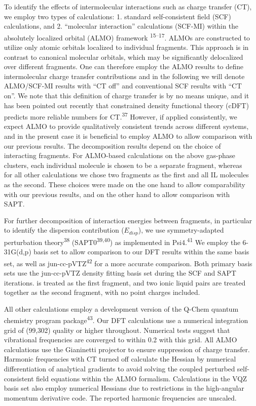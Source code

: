 To identify the effects of intermolecular interactions such as charge transfer (CT), we employ two types of calculations: 1. standard self-consistent field (SCF) calculations, and 2. ``molecular interaction'' calculations (SCF-MI) within the absolutely localized orbital (ALMO) framework \textsuperscript{15--17}. ALMOs are constructed to utilize only atomic orbitals localized to individual fragments. This approach is in contrast to canonical molecular orbitals, which may be significantly delocalized over different fragments. One can therefore employ the ALMO results to define intermolecular charge transfer contributions and in the following we will denote ALMO/SCF-MI results with ``CT off'' and conventional SCF results with ``CT on''. We note that this definition of charge transfer is by no means unique, and it has been pointed out recently that constrained density functional theory (cDFT) predicts more reliable numbers for CT.\textsuperscript{37} However, if applied consistently, we expect ALMO to provide qualitatively consistent trends across different systems, and in the present case it is beneficial to employ ALMO to allow comparison with our previous results. The decomposition results depend on the choice of interacting fragments. For ALMO-based calculations on the above gas-phase clusters, each individual molecule is chosen to be a separate fragment, whereas for all other calculations we chose two fragments \textemdash{}  as the first and all IL molecules as the second. These choices were made on the one hand to allow comparability with our previous results, and on the other hand to allow comparison with SAPT.

For further decomposition of interaction energies between fragments, in particular to identify the dispersion contribution (\(E_{disp}\)), we use symmetry-adapted perturbation theory\textsuperscript{38} (SAPT0\textsuperscript{39,40}) as implemented in Psi4.\textsuperscript{41} We employ the 6-31G(d,p) basis set to allow comparison to our DFT results within the same basis set, as well as jun-cc-pVTZ\textsuperscript{42} for a more accurate comparison. Both primary basis sets use the jun-cc-pVTZ density fitting basis set during the SCF and SAPT iterations.  is treated as the first fragment, and two ionic liquid pairs are treated together as the second fragment, with no point charges included.

All other calculations employ a development version of the Q-Chem quantum chemistry program package\textsuperscript{43}. Our DFT calculations use a numerical integration grid of (99,302) quality or higher throughout. Numerical tests suggest that vibrational frequencies are converged to within \SI{0.2}{\wavenumber} with this grid. All ALMO calculations use the Gianinetti projector to ensure suppression of charge transfer. Harmonic frequencies with CT turned off calculate the Hessian by numerical differentiation of analytical gradients to avoid solving the coupled perturbed self-consistent field equations within the ALMO formalism. Calculations in the VQZ basis set also employ numerical Hessians due to restrictions in the high-angular momentum derivative code. The reported harmonic frequencies are unscaled.

